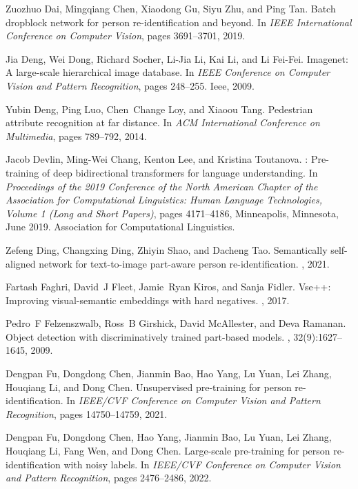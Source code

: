 \documentclass[10pt,twocolumn,letterpaper]{article}
\begin{document}
\begin{thebibliography}{10}
Zuozhuo Dai, Mingqiang Chen, Xiaodong Gu, Siyu Zhu, and Ping Tan.
\newblock Batch dropblock network for person re-identification and beyond.
\newblock In {\em IEEE International Conference on Computer Vision}, pages
  3691--3701, 2019.

Jia Deng, Wei Dong, Richard Socher, Li-Jia Li, Kai Li, and Li Fei-Fei.
\newblock Imagenet: A large-scale hierarchical image database.
\newblock In {\em IEEE Conference on Computer Vision and Pattern Recognition},
  pages 248--255. Ieee, 2009.

Yubin Deng, Ping Luo, Chen~Change Loy, and Xiaoou Tang.
\newblock Pedestrian attribute recognition at far distance.
\newblock In {\em ACM International Conference on Multimedia}, pages 789--792,
  2014.

Jacob Devlin, Ming-Wei Chang, Kenton Lee, and Kristina Toutanova.
: Pre-training of deep bidirectional transformers for language
  understanding.
\newblock In {\em Proceedings of the 2019 Conference of the North {A}merican
  Chapter of the Association for Computational Linguistics: Human Language
  Technologies, Volume 1 (Long and Short Papers)}, pages 4171--4186,
  Minneapolis, Minnesota, June 2019. Association for Computational Linguistics.

Zefeng Ding, Changxing Ding, Zhiyin Shao, and Dacheng Tao.
\newblock Semantically self-aligned network for text-to-image part-aware person
  re-identification.
, 2021.

Fartash Faghri, David~J Fleet, Jamie~Ryan Kiros, and Sanja Fidler.
\newblock Vse++: Improving visual-semantic embeddings with hard negatives.
, 2017.

Pedro~F Felzenszwalb, Ross~B Girshick, David McAllester, and Deva Ramanan.
\newblock Object detection with discriminatively trained part-based models.
,
  32(9):1627--1645, 2009.

Dengpan Fu, Dongdong Chen, Jianmin Bao, Hao Yang, Lu Yuan, Lei Zhang, Houqiang
  Li, and Dong Chen.
\newblock Unsupervised pre-training for person re-identification.
\newblock In {\em IEEE/CVF Conference on Computer Vision and Pattern
  Recognition}, pages 14750--14759, 2021.

Dengpan Fu, Dongdong Chen, Hao Yang, Jianmin Bao, Lu Yuan, Lei Zhang, Houqiang
  Li, Fang Wen, and Dong Chen.
\newblock Large-scale pre-training for person re-identification with noisy
  labels.
\newblock In {\em IEEE/CVF Conference on Computer Vision and Pattern
  Recognition}, pages 2476--2486, 2022.


\end{thebibliography}
\end{document}
